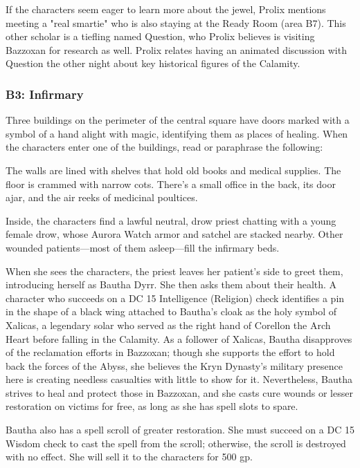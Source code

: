 \documentclass[10pt,a4paper,twoside,bg=print,twocolumn,openany,nodeprecatedcode]{dndbook}
\begin{document}
If the characters seem eager to learn more about the jewel, Prolix mentions meeting a "real smartie" who is also staying at the Ready Room (area B7). This other scholar is a tiefling named Question, who Prolix believes is visiting Bazzoxan for research as well. Prolix relates having an animated discussion with Question the other night about key historical figures of the Calamity.

\subsubsection{B3: Infirmary}
Three buildings on the perimeter of the central square have doors marked with a symbol of a hand alight with magic, identifying them as places of healing. When the characters enter one of the buildings, read or paraphrase the following:

\begin{DndReadAloud}{}
The walls are lined with shelves that hold old books and medical supplies. The floor is crammed with narrow cots. There's a small office in the back, its door ajar, and the air reeks of medicinal poultices.

\end{DndReadAloud}

Inside, the characters find a lawful neutral, drow priest chatting with a young female drow, whose Aurora Watch armor and satchel are stacked nearby. Other wounded patients—most of them asleep—fill the infirmary beds.

When she sees the characters, the priest leaves her patient's side to greet them, introducing herself as Bautha Dyrr. She then asks them about their health. A character who succeeds on a DC 15 Intelligence (Religion) check identifies a pin in the shape of a black wing attached to Bautha's cloak as the holy symbol of Xalicas, a legendary solar who served as the right hand of Corellon the Arch Heart before falling in the Calamity. As a follower of Xalicas, Bautha disapproves of the reclamation efforts in Bazzoxan; though she supports the effort to hold back the forces of the Abyss, she believes the Kryn Dynasty's military presence here is creating needless casualties with little to show for it. Nevertheless, Bautha strives to heal and protect those in Bazzoxan, and she casts cure wounds or lesser restoration on victims for free, as long as she has spell slots to spare.

Bautha also has a spell scroll of greater restoration. She must succeed on a DC 15 Wisdom check to cast the spell from the scroll; otherwise, the scroll is destroyed with no effect. She will sell it to the characters for 500 gp.
\end{document}
